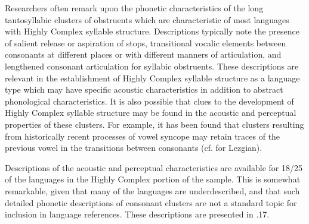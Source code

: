   Researchers often remark upon the phonetic characteristics of the long tautosyllabic clusters of obstruents which are characteristic of most languages with Highly Complex syllable structure. Descriptions typically note the presence of salient release or aspiration of stops, transitional vocalic elements between consonants at different places or with different manners of articulation, and lengthened consonant articulation for syllabic obstruents. These descriptions are relevant in the establishment of Highly Complex syllable structure as a language type which may have specific acoustic characteristics in addition to abstract phonological characteristics. It is also possible that clues to the development of Highly Complex syllable structure may be found in the acoustic and perceptual properties of these clusters. For example, it has been found that clusters resulting from historically recent processes of vowel syncope may retain traces of the previous vowel in the transitions between consonants (cf. \citealt{ChitoranBabaliyeva2007} for Lezgian).

  Descriptions of the acoustic and perceptual characteristics are available for 18/25 of the languages in the Highly Complex portion of the sample. This is somewhat remarkable, given that many of the languages are underdescribed, and that such detailed phonetic descriptions of consonant clusters are not a standard topic for inclusion in language references. These descriptions are presented in .17.


